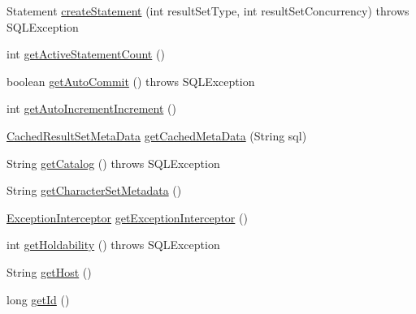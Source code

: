 \begin{DoxyCompactItemize}
\item 
Statement \mbox{\hyperlink{classcom_1_1mysql_1_1cj_1_1jdbc_1_1ha_1_1_multi_host_my_s_q_l_connection_affad789183eb149d3b219bc1cb27fc76}{create\+Statement}} (int result\+Set\+Type, int result\+Set\+Concurrency)  throws S\+Q\+L\+Exception 
\item 
int \mbox{\hyperlink{classcom_1_1mysql_1_1cj_1_1jdbc_1_1ha_1_1_multi_host_my_s_q_l_connection_a5f85b0597c870954959bd5c2a48ae28b}{get\+Active\+Statement\+Count}} ()
\item 
boolean \mbox{\hyperlink{classcom_1_1mysql_1_1cj_1_1jdbc_1_1ha_1_1_multi_host_my_s_q_l_connection_a6b62ddd7ccef987f5f94910e5cdd7d96}{get\+Auto\+Commit}} ()  throws S\+Q\+L\+Exception 
\item 
int \mbox{\hyperlink{classcom_1_1mysql_1_1cj_1_1jdbc_1_1ha_1_1_multi_host_my_s_q_l_connection_a94d28c91c18c2c57cd4ec7855a3d061d}{get\+Auto\+Increment\+Increment}} ()
\item 
\mbox{\hyperlink{interfacecom_1_1mysql_1_1cj_1_1jdbc_1_1result_1_1_cached_result_set_meta_data}{Cached\+Result\+Set\+Meta\+Data}} \mbox{\hyperlink{classcom_1_1mysql_1_1cj_1_1jdbc_1_1ha_1_1_multi_host_my_s_q_l_connection_aa19a1c9b0278b332547fdb7b8e8c0309}{get\+Cached\+Meta\+Data}} (String sql)
\item 
String \mbox{\hyperlink{classcom_1_1mysql_1_1cj_1_1jdbc_1_1ha_1_1_multi_host_my_s_q_l_connection_a3dc8e35cd35fa5cdee8d08ff2bb07c1e}{get\+Catalog}} ()  throws S\+Q\+L\+Exception 
\item 
String \mbox{\hyperlink{classcom_1_1mysql_1_1cj_1_1jdbc_1_1ha_1_1_multi_host_my_s_q_l_connection_ae2ebfd196578e13481ef5f604675acc1}{get\+Character\+Set\+Metadata}} ()
\item 
\mbox{\hyperlink{interfacecom_1_1mysql_1_1cj_1_1exceptions_1_1_exception_interceptor}{Exception\+Interceptor}} \mbox{\hyperlink{classcom_1_1mysql_1_1cj_1_1jdbc_1_1ha_1_1_multi_host_my_s_q_l_connection_a137370a98bed09d640fa15f2b8832e8b}{get\+Exception\+Interceptor}} ()
\item 
int \mbox{\hyperlink{classcom_1_1mysql_1_1cj_1_1jdbc_1_1ha_1_1_multi_host_my_s_q_l_connection_ace28925089c2e77c186fb187557e7943}{get\+Holdability}} ()  throws S\+Q\+L\+Exception 
\item 
String \mbox{\hyperlink{classcom_1_1mysql_1_1cj_1_1jdbc_1_1ha_1_1_multi_host_my_s_q_l_connection_a743a72dc450ec9101994c9dd8d83dbe9}{get\+Host}} ()
\item 
long \mbox{\hyperlink{classcom_1_1mysql_1_1cj_1_1jdbc_1_1ha_1_1_multi_host_my_s_q_l_connection_a1c1baa5c3292115f16511d6f99d69154}{get\+Id}} ()

\end{DoxyCompactItemize}
